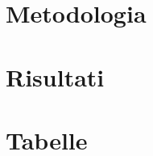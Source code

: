 \documentclass[12pt, a4paper]{article}
\begin{document}


\tableofcontents
\newpage


\newpage

\section{Metodologia}




\newpage

\section{Risultati}




\newpage


\newpage


\newpage

\clearpage
\appendix
\renewcommand{\thesection}{\Alph{section}}
\setcounter{section}{0}
\section{Tabelle}
\label{app:tabelle}

\end{document}
